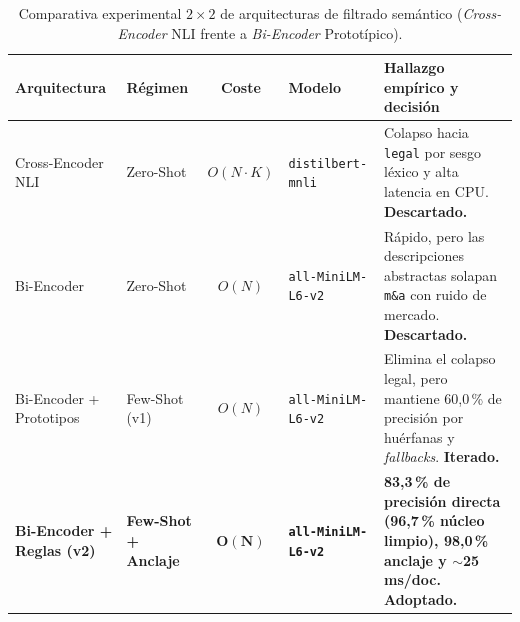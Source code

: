 \begin{table}[H]
    \centering
    \caption{Comparativa experimental $2 \times 2$ de arquitecturas de filtrado semántico (\textit{Cross-Encoder} NLI frente a \textit{Bi-Encoder} Prototípico).}
    \label{tab:comparativa_gatekeeper}
    \renewcommand{\arraystretch}{1.2}
    \footnotesize
    \begin{tabularx}{\textwidth}{@{}p{2.7cm}p{1.9cm}cp{2.7cm}X@{}}
        \toprule
        \textbf{Arquitectura} & \textbf{Régimen} & \textbf{Coste} & \textbf{Modelo} & \textbf{Hallazgo empírico y decisión} \\
        \midrule
        Cross-Encoder NLI~\cite{yin2019zeroshot} & Zero-Shot & $O(N{\cdot}K)$ & \texttt{distilbert-\allowbreak mnli}~\cite{sanh2019distilbert} & Colapso hacia \texttt{legal} por sesgo léxico y alta latencia en CPU. \textbf{Descartado.} \\
        Bi-Encoder~\cite{reimers2019sbert} & Zero-Shot & $O(N)$ & \texttt{all-MiniLM-\allowbreak L6-v2}~\cite{wang2020minilm} & Rápido, pero las descripciones abstractas solapan \texttt{m\&a} con ruido de mercado. \textbf{Descartado.} \\
        Bi-Encoder + Prototipos~\cite{snell2017prototypical} & Few-Shot (v1) & $O(N)$ & \texttt{all-MiniLM-\allowbreak L6-v2} & Elimina el colapso legal, pero mantiene 60,0\,\% de precisión por huérfanas y \textit{fallbacks}. \textbf{Iterado.} \\
        \textbf{Bi-Encoder + Reglas (v2)} & \textbf{Few-Shot + Anclaje} & $\mathbf{O(N)}$ & \textbf{\texttt{all-MiniLM-\allowbreak L6-v2}} & \textbf{83,3\,\% de precisión directa (96,7\,\% núcleo limpio), 98,0\,\% anclaje y $\sim$25\,ms/doc. Adoptado.} \\
        \bottomrule
    \end{tabularx}
\end{table}

